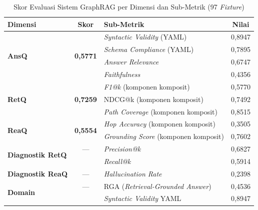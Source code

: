 \renewcommand{\arraystretch}{1.3}
\captionsetup[table]{justification=raggedright,singlelinecheck=false}
\begin{table}[H]
\caption{Skor Evaluasi Sistem GraphRAG per Dimensi dan Sub-Metrik (97 \textit{Fixture})}
\label{tbl:dimension_scores}
\centering
\begin{tabular}{| p{} | c | p{} | c |}
\hline
\textbf{Dimensi} & \textbf{Skor} & \textbf{Sub-Metrik} & \textbf{Nilai} \\
\hline
\multirow{4}{*}{\textbf{AnsQ}} & \multirow{4}{*}{\textbf{0,5771}} & \textit{Syntactic Validity} (YAML) & 0,8947 \\
\cline{3-4}
 &  & \textit{Schema Compliance} (YAML) & 0,7895 \\
\cline{3-4}
 &  & \textit{Answer Relevance} & 0,6747 \\
\cline{3-4}
 &  & \textit{Faithfulness} & 0,4356 \\
\hline
\multirow{3}{*}{\textbf{RetQ}} & \multirow{3}{*}{\textbf{0,7259}} & \textit{F1@k} (komponen komposit) & 0,5770 \\
\cline{3-4}
 &  & NDCG@k (komponen komposit) & 0,7492 \\
\cline{3-4}
 &  & \textit{Path Coverage} (komponen komposit) & 0,8515 \\
\hline
\multirow{2}{*}{\textbf{ReaQ}} & \multirow{2}{*}{\textbf{0,5554}} & \textit{Hop Accuracy} (komponen komposit) & 0,3505 \\
\cline{3-4}
 &  & \textit{Grounding Score} (komponen komposit) & 0,7602 \\
\hline
\multirow{2}{*}{\textbf{Diagnostik RetQ}} & --- & \textit{Precision@k} & 0,6827 \\
\cline{3-4}
 &  & \textit{Recall@k} & 0,5914 \\
\hline
\textbf{Diagnostik ReaQ} & --- & \textit{Hallucination Rate} & 0,2398 \\
\hline
\multirow{2}{*}{\textbf{Domain}} & --- & RGA (\textit{Retrieval-Grounded Answer}) & 0,4536 \\
\cline{3-4}
 &  & \textit{Syntactic Validity} YAML & 0,8947 \\
\hline
\end{tabular}
\end{table}

